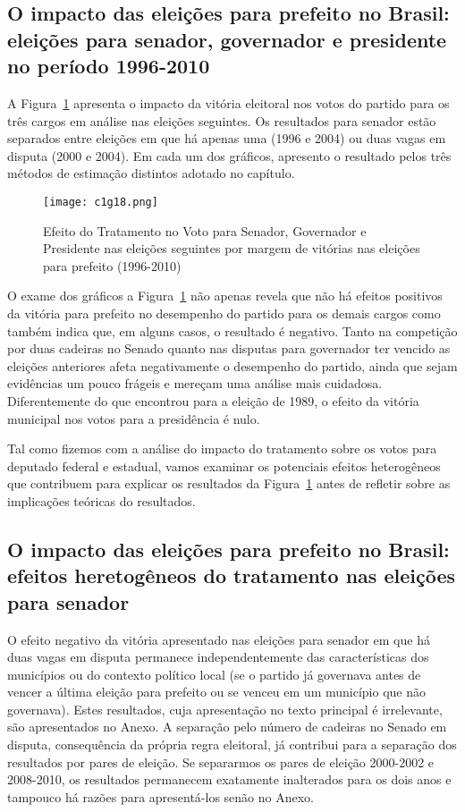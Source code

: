 \subsection{O impacto das eleições para prefeito no Brasil: eleições para senador, governador e presidente no período 1996-2010}
 
A Figura~\ref{fig:c1g18} apresenta o impacto da vitória eleitoral nos votos do partido para os três cargos em análise nas eleições seguintes. Os resultados para senador estão separados entre eleições em que há apenas uma (1996 e 2004) ou duas vagas em disputa (2000 e 2004). Em cada um dos gráficos, apresento o resultado pelos três métodos de estimação distintos adotado no capítulo.

\begin{figure}[htp]
	\centering
	\texttt{[image: c1g18.png]}
	\caption{Efeito do Tratamento no Voto para Senador, Governador e Presidente nas eleições seguintes por margem de vitórias nas eleições para prefeito (1996-2010)}
	\label{fig:c1g18} 
\end{figure}


O exame dos gráficos a Figura~\ref{fig:c1g18} não apenas revela que não há efeitos positivos da vitória para prefeito no desempenho do partido para os demais cargos como também indica que, em alguns casos, o resultado é negativo. Tanto na competição por duas cadeiras no Senado quanto nas disputas para governador ter vencido as eleições anteriores afeta negativamente o desempenho do partido, ainda que sejam evidências um pouco frágeis e mereçam uma análise mais cuidadosa. Diferentemente do que encontrou \citet{Ames1994} para a eleição de 1989, o efeito da vitória municipal nos votos para a presidência é nulo.

Tal como fizemos com a análise do impacto do tratamento sobre os votos para deputado federal e estadual, vamos examinar os potenciais efeitos heterogêneos que contribuem para explicar os resultados da Figura~\ref{fig:c1g18} antes de refletir sobre as implicações teóricas do resultados.

\subsection{O impacto das eleições para prefeito no Brasil: efeitos heretogêneos do tratamento nas eleições para senador}

O efeito negativo da vitória apresentado nas eleições para senador em que há duas vagas em disputa permanece independentemente das características dos municípios ou do contexto político local (se o partido já governava antes de vencer a última eleição para prefeito ou se venceu em um município que não governava). Estes resultados, cuja apresentação no texto principal é irrelevante, são apresentados no Anexo. A separação pelo número de cadeiras no Senado em disputa, consequência da própria regra eleitoral, já contribui para a separação dos resultados por pares de eleição. Se separarmos os pares de eleição 2000-2002 e 2008-2010, os resultados permanecem exatamente inalterados para os dois anos e tampouco há razões para apresentá-los senão no Anexo.

